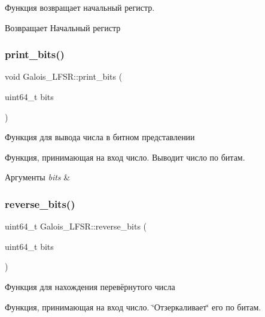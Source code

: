 Функция возвращает начальный регистр.

\begin{DoxyReturn}{Возвращает}
Начальный регистр 
\end{DoxyReturn}
\mbox{\label{classGalois__LFSR_a7a2d2fa3f9f7973cb520d92267f58f4d}} 
\subsubsection{\texorpdfstring{print\+\_\+bits()}{print\_bits()}}
{\footnotesize\ttfamily void Galois\+\_\+\+L\+F\+S\+R\+::print\+\_\+bits (\begin{DoxyParamCaption}\item[{uint64\+\_\+t}]{bits }\end{DoxyParamCaption})}



Функция для вывода числа в битном представлении 

Функция, принимающая на вход число. Выводит число по битам.


\begin{DoxyParams}{Аргументы}
{\em bits} & \\
\hline
\end{DoxyParams}
\mbox{\label{classGalois__LFSR_ae8b9c21348f0f6f75c539e7a8667be88}} 
\subsubsection{\texorpdfstring{reverse\+\_\+bits()}{reverse\_bits()}}
{\footnotesize\ttfamily uint64\+\_\+t Galois\+\_\+\+L\+F\+S\+R\+::reverse\+\_\+bits (\begin{DoxyParamCaption}\item[{uint64\+\_\+t}]{bits }\end{DoxyParamCaption})}



Функция для нахождения перевёрнутого числа 

Функция, принимающая на вход число. \char`\"{}Отзеркаливает\char`\"{} его по битам.


